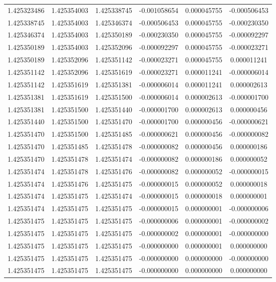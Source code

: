 \documentclass[fleqn]{article}
\begin{document}
\begin{enumerate}
\begin{enumerate}[label=\roman*.]
{\begin{tabular}{ |c|c|c|c|c|c| }
							1.425323486&1.425354003&1.425338745&-0.001058654&0.000045755&-0.000506453\\
							1.425338745&1.425354003&1.425346374&-0.000506453&0.000045755&-0.000230350\\
							1.425346374&1.425354003&1.425350189&-0.000230350&0.000045755&-0.000092297\\
							1.425350189&1.425354003&1.425352096&-0.000092297&0.000045755&-0.000023271\\
							1.425350189&1.425352096&1.425351142&-0.000023271&0.000045755&0.000011241\\
							1.425351142&1.425352096&1.425351619&-0.000023271&0.000011241&-0.000006014\\
							1.425351142&1.425351619&1.425351381&-0.000006014&0.000011241&0.000002613\\
							1.425351381&1.425351619&1.425351500&-0.000006014&0.000002613&-0.000001700\\
							1.425351381&1.425351500&1.425351440&-0.000001700&0.000002613&0.000000456\\
							1.425351440&1.425351500&1.425351470&-0.000001700&0.000000456&-0.000000621\\
							1.425351470&1.425351500&1.425351485&-0.000000621&0.000000456&-0.000000082\\
							1.425351470&1.425351485&1.425351478&-0.000000082&0.000000456&0.000000186\\
							1.425351470&1.425351478&1.425351474&-0.000000082&0.000000186&0.000000052\\
							1.425351474&1.425351478&1.425351476&-0.000000082&0.000000052&-0.000000015\\
							1.425351474&1.425351476&1.425351475&-0.000000015&0.000000052&0.000000018\\
							1.425351474&1.425351475&1.425351474&-0.000000015&0.000000018&0.000000001\\
							1.425351474&1.425351475&1.425351475&-0.000000015&0.000000001&-0.000000006\\
							1.425351475&1.425351475&1.425351475&-0.000000006&0.000000001&-0.000000002\\
							1.425351475&1.425351475&1.425351475&-0.000000002&0.000000001&-0.000000000\\
							1.425351475&1.425351475&1.425351475&-0.000000000&0.000000001&0.000000000\\
							1.425351475&1.425351475&1.425351475&-0.000000000&0.000000000&-0.000000000\\
							1.425351475&1.425351475&1.425351475&-0.000000000&0.000000000&0.000000000\\

\end{tabular}}
\end{enumerate}
\end{enumerate}
\end{document}
